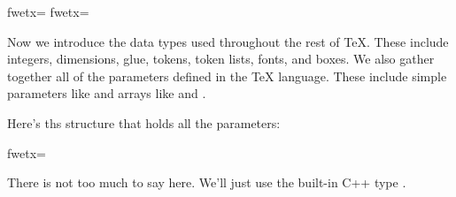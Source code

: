 \fwbeginmacro
{}\fwequals \fwodef {}fwetx=%
\fwoparen \fwoquote{}\fwcquote\fwcomma \fwoquote{}\fwcquote\fwcparen \fwbtx[
]fwetx=%
\fwcdef 
\fwbeginmacronotes
{}
\fwendmacronotes
\fwendmacro


Now we introduce the data types used throughout the rest of \TeX{}.
These include integers, dimensions, glue, tokens, token lists,
fonts, and boxes. We also gather together all of the parameters
defined in the \TeX{} language. These include simple parameters
like  and arrays like  and .

Here's ths structure that holds all the parameters:

\fwbeginmacro
{}\fwequals \fwodef {}fwetx=%
\fwcdef 
\fwbeginmacronotes
{}
\fwendmacronotes
\fwendmacro



There is not too much to say here. We'll just use the built-in C++ type
.

